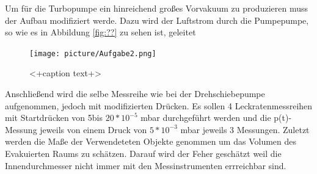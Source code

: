 Um für die Turbopumpe ein hinreichend großes Vorvakuum zu produzieren muss der Aufbau modifiziert werde. Dazu wird der Luftstrom durch die Pumpepumpe, so wie es in Abbildung \ref{fig:??} zu sehen ist, geleitet
\begin{figure}[htpb]
  \centering
  \texttt{[image: picture/Aufgabe2.png]}
  \caption{<+caption text+>}
  \label{fig:<+label+>}
\end{figure}
Anschließend wird die selbe Messreihe wie bei der Drehschiebepumpe aufgenommen,  jedoch mit modifizierten Drücken. Es sollen 4 Leckratenmessreihen mit Startdrücken von 5bis $20*10^{-5}$ mbar durchgeführt werden und die p(t)-Messung jeweils von einem Druck von $5*10^{-3}$ mbar jeweils 3 Messungen. 
Zuletzt werden die Maße der Verwendeteten Objekte genommen um das Volumen des Evakuierten Raums zu schätzen. Darauf wird der Feher geschätzt weil die Innendurchmesser nicht immer mit den Messinstrumenten errreichbar sind.
